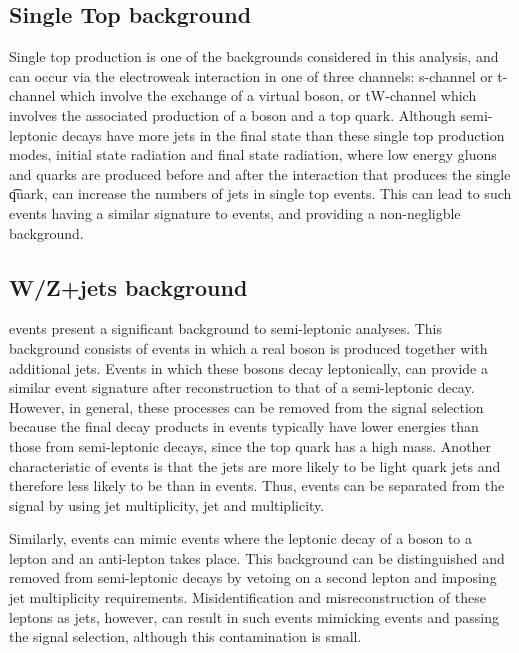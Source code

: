 \subsection{Single Top background}
\label{ss:single_top}
Single top production is one of the backgrounds considered in this analysis, and can occur via the electroweak
interaction in one of three channels: s-channel or t-channel which involve the exchange of a virtual \W boson,
or tW-channel which involves the associated production of a \W boson and a top quark. Although semi-leptonic
\ttbar decays have more jets in the final state than these single top production modes, initial state
radiation and final state radiation, where low energy gluons and quarks are produced before and after the
interaction that produces the single \t quark, can increase the numbers of jets in single top events. This can
lead to such events having a similar signature to \ttbar events, and providing a non-negligble background.

\subsection{W/Z+jets background}
\label{ss:w_z_plus_jets}
\WpJets events present a significant background to semi-leptonic \ttbar analyses. This background consists of
events in which a real \W boson is produced together with additional jets. Events in which these \W bosons
decay leptonically, can provide a similar event signature after reconstruction to that of a semi-leptonic
\ttbar decay. However, in general, these processes can be removed from the signal selection because the final
decay products in \WpJets events typically have lower energies than those from semi-leptonic \ttbar decays,
since the top quark has a high mass. Another characteristic of \WpJets events is that the jets are more likely
to be light quark jets and therefore less likely to be \bjets than in \ttbar events. Thus, \WpJets events can
be separated from the \ttbar signal by using jet multiplicity, jet \pt and \bjet multiplicity.

Similarly, \ZpJets events can mimic \ttbar events where the leptonic decay of a \Z boson to a lepton and an
anti-lepton takes place. This background can be distinguished and removed from semi-leptonic \ttbar decays by
vetoing on a second lepton and imposing jet multiplicity requirements. Misidentification and misreconstruction
of these leptons as jets, however, can result in such events mimicking \ttbar events and passing the signal
selection, although this contamination is small.

